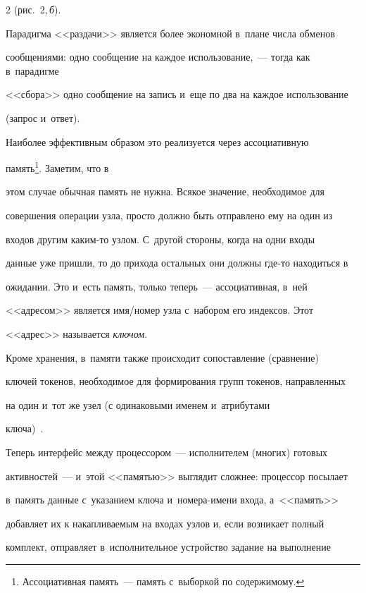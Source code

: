 \begin{multicols}{2}
(рис.~2,\,\textit{б}).

  

  

  Парадигма <<раздачи>> является более экономной в~плане числа обменов 

сообщениями: одно сообщение на каждое использование,~--- тогда как в~парадигме 

<<сбора>> одно сообщение на запись и~еще по два на каждое использование 

(запрос и~ответ).

  

  Наиболее эффективным образом это реализуется через ассоциативную 

память\footnote{Ассоциативная память~--- память с~выборкой по содержимому.}. Заметим, что в~

этом случае обычная память не нужна. Всякое значение, необходимое для 

совершения операции узла, просто должно быть отправлено ему на один из 

входов другим ка\-ким-то узлом. С~другой стороны, когда на одни входы 

данные уже пришли, то до прихода остальных они должны где-то находиться в~

ожидании. Это и~есть память, только теперь~--- ассоциативная, в~ней 

<<адресом>> является имя/но\-мер узла с~набором его индексов. Этот 

<<адрес>> называется \textit{ключом}.

  

  Кроме хранения, в~памяти также происходит сопоставление (сравнение) 

ключей токенов, необходимое для формирования групп токенов, на\-прав\-лен\-ных 

на один и~тот же узел (с одинаковыми именем и~атрибутами  

ключа)~\cite{4-zm}.



 

  Теперь интерфейс между процессором~--- исполнителем (многих) готовых 

активностей~--- и~этой <<памятью>> выглядит сложнее: процессор посылает 

в~память данные с~указанием ключа и~но\-ме\-ра-име\-ни входа, а~<<память>> 

добавляет их к накапливаемым на входах узлов и, если возникает полный 

комплект, отправляет в~исполнительное устройство задание на выполнение 


\end{multicols}
